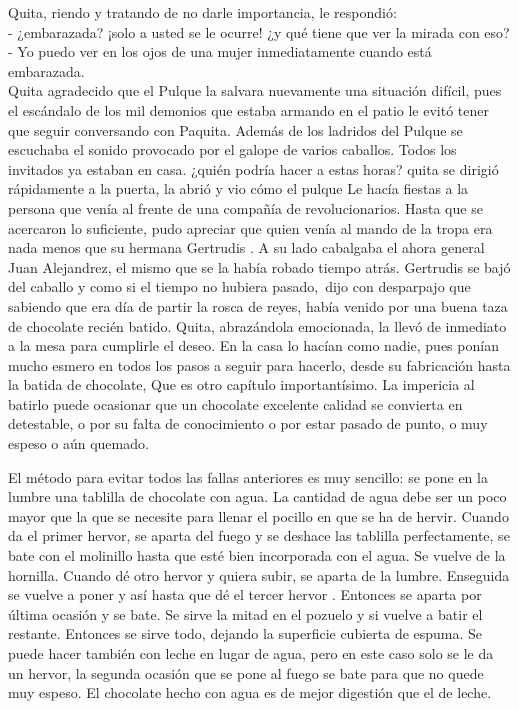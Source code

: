 Quita, riendo y tratando de no darle importancia, le respondió:
\\- ¿embarazada? ¡solo a usted se le ocurre! ¿y qué tiene que ver la %
mirada con eso? %
\\- Yo puedo ver en los ojos de una mujer inmediatamente cuando está %
embarazada.\\

Quita agradecido que el Pulque la salvara nuevamente una situación
difícil, pues el escándalo de los mil demonios que estaba armando en el
patio le evitó tener que seguir conversando con Paquita. Además de los
ladridos del Pulque se escuchaba el sonido provocado por el galope de
varios caballos. Todos los invitados ya estaban en casa. ¿quién podría
hacer a estas horas? quita se dirigió rápidamente a la puerta, la abrió
y vio cómo el pulque Le hacía fiestas a la persona que venía al frente
de una compañía de revolucionarios. Hasta que se acercaron lo
suficiente, pudo apreciar que quien venía al mando de la tropa era nada
menos que su hermana Gertrudis . A su lado cabalgaba el ahora general
Juan Alejandrez, el mismo que se la había robado tiempo atrás. Gertrudis
se bajó del caballo y como si el tiempo no hubiera pasado,~dijo
con desparpajo que sabiendo que era día de partir la rosca de reyes,
había venido por una buena taza de chocolate recién batido. Quita,
abrazándola emocionada, la llevó de inmediato a la mesa para cumplirle
el deseo. En la casa lo hacían como nadie, pues ponían mucho esmero en
todos los pasos a seguir para hacerlo, desde su fabricación hasta la
batida de chocolate, Que es otro capítulo importantísimo. La impericia
al batirlo puede ocasionar que un chocolate excelente calidad se
convierta en detestable, o por su falta de conocimiento o por estar
pasado de punto, o muy espeso o aún quemado.

El método para evitar todos las fallas anteriores es muy sencillo: se
pone en la lumbre una tablilla de chocolate con agua. La cantidad de
agua debe ser un poco mayor que la que se necesite para llenar el
pocillo en que se ha de hervir. Cuando da el primer hervor, se aparta
del fuego y se deshace las tablilla perfectamente, se bate con el
molinillo hasta que esté bien incorporada con el agua. Se vuelve de la
hornilla. Cuando dé otro hervor y quiera subir, se aparta de la lumbre.
Enseguida se vuelve a poner y así hasta que dé el tercer hervor .
Entonces se aparta por última ocasión y se bate. Se sirve la mitad en el
pozuelo y si vuelve a batir el restante. Entonces se sirve todo, dejando
la superficie cubierta de espuma. Se puede hacer también con leche en
lugar de agua, pero en este caso solo se le da un hervor, la segunda
ocasión que se pone al fuego se bate para que no quede muy espeso. El
chocolate hecho con agua es de mejor digestión que el de leche.


